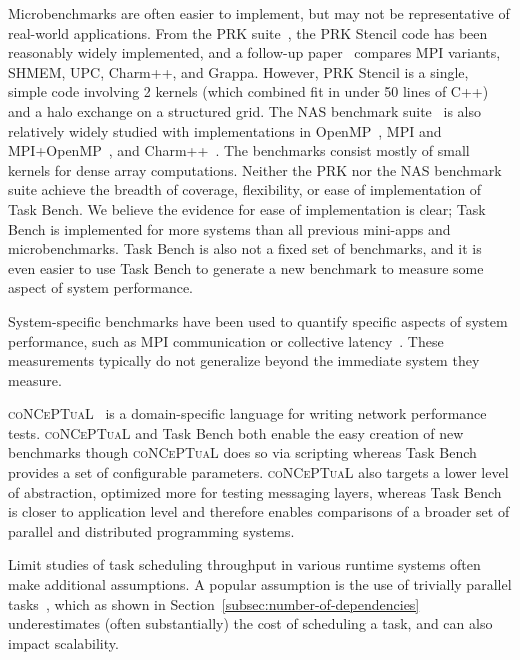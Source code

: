 Microbenchmarks are often easier to implement, but may not be
representative of real-world applications. From the PRK
suite~\cite{PRK14}, the PRK Stencil code has been reasonably widely
implemented, and a follow-up paper~\cite{PRKRuntimes16} compares MPI
variants, SHMEM, UPC, Charm++, and Grappa. However, PRK Stencil is a
single, simple code involving 2 kernels (which combined fit in under 50 lines
of C++) and a halo exchange on a structured grid. The NAS benchmark suite~\cite{NAS91, NAS95} is also relatively widely studied with
implementations in OpenMP~\cite{NASOpenMP99}, MPI and
MPI+OpenMP~\cite{NASMPIOpenMP00}, and
Charm++~\cite{NASCharm96}. The benchmarks consist mostly of small
kernels for dense array computations. Neither the PRK nor the NAS
benchmark suite achieve the breadth of coverage, flexibility, or ease
of implementation of Task Bench. We believe the evidence for ease of
implementation is clear; Task Bench is implemented for more systems
than all previous mini-apps and microbenchmarks. Task Bench is also
not a fixed set of benchmarks, and it is even easier to use Task Bench
to generate a new benchmark to measure some aspect of system
performance.

System-specific benchmarks have been used to quantify specific aspects
of system performance, such as MPI communication or collective
latency~\cite{MPPTest99, MPIBench01}. These measurements typically do
not generalize beyond the immediate system they measure.

\textsc{coNCePTuaL}~\cite{Conceptual07} is a domain-specific language
for writing network performance tests. \textsc{coNCePTuaL} and Task
Bench both enable the easy creation of new benchmarks though
\textsc{coNCePTuaL} does so via scripting whereas Task Bench provides
a set of configurable parameters. \textsc{coNCePTuaL} also targets a
lower level of abstraction, optimized more for testing messaging
layers, whereas Task Bench is closer to application level and
therefore enables comparisons of a broader set of parallel and
distributed programming systems.

Limit studies of task scheduling throughput in various runtime systems
often make additional assumptions. A popular assumption is the use of
trivially parallel tasks~\cite{Canary16, Armstrong14}, which as shown
in Section~\ref{subsec:number-of-dependencies} underestimates (often
substantially) the cost of scheduling a task, and can also impact scalability.
